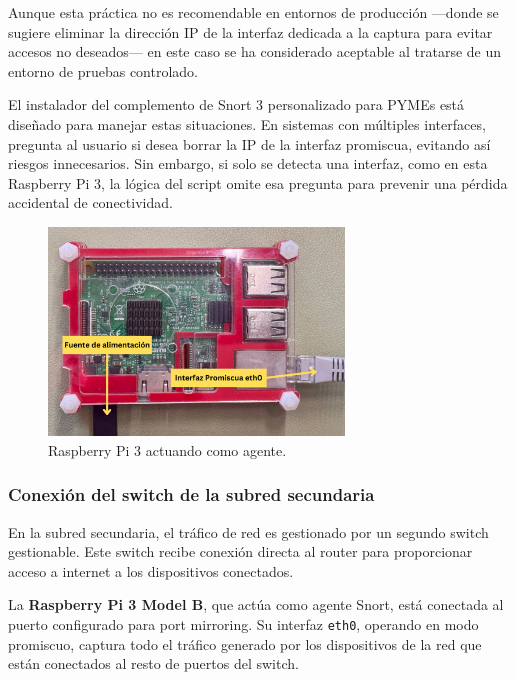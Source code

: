 \documentclass[11pt,a4paper,twoside]{report}
\begin{document}
Aunque esta práctica no es recomendable en entornos de producción —donde se sugiere eliminar la dirección IP de la interfaz dedicada a la captura para evitar accesos no deseados— en este caso se ha considerado aceptable al tratarse de un entorno de pruebas controlado.\newline

El instalador del complemento de Snort 3 personalizado para PYMEs está diseñado para manejar estas situaciones. En sistemas con múltiples interfaces, pregunta al usuario si desea borrar la IP de la interfaz promiscua, evitando así riesgos innecesarios. Sin embargo, si solo se detecta una interfaz, como en esta Raspberry Pi 3, la lógica del script omite esa pregunta para prevenir una pérdida accidental de conectividad.

\begin{figure}[H]
	\centering
	\includegraphics[width=0.7\textwidth]{install/0.3.png}
	\caption{Raspberry Pi 3 actuando como agente.}
	\label{fig:conexion-agente-rpi3}
\end{figure}


\subsubsection{Conexión del switch de la subred secundaria}

En la subred secundaria, el tráfico de red es gestionado por un segundo switch gestionable. Este switch recibe conexión directa al router para proporcionar acceso a internet a los dispositivos conectados.\newline

La \textbf{Raspberry Pi 3 Model B}, que actúa como agente Snort, está conectada al puerto configurado para port mirroring. Su interfaz \texttt{eth0}, operando en modo promiscuo, captura todo el tráfico generado por los dispositivos de la red que están conectados al resto de puertos del switch.\newline
\end{document}
